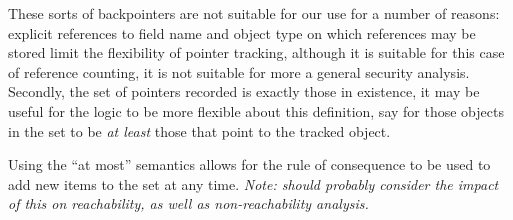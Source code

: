 \documentclass[a4paper]{article}
\begin{document}
These sorts of backpointers are not suitable for our use for a number of
reasons: explicit references to field name and object type on
which references may be stored limit the flexibility of pointer tracking,
although it is suitable for this case of reference counting, it is not suitable
for more a general security analysis. Secondly, the set of pointers recorded is
exactly those in existence, it may be useful for the logic to be more flexible
about this definition, say for those objects in the set to be \emph{at least}
those that point to the tracked object.

Using the ``at most'' semantics allows for the rule of consequence to be used to
add new items to the set at any time. \emph{Note: should probably consider the
impact of this on reachability, as well as non-reachability analysis.}



\end{document}
